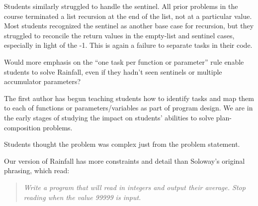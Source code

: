 Students similarly struggled to handle the sentinel.  All prior
problems in the course terminated a list recursion at the end of the
list, not at a particular value.  Most students recognized 
the sentinel as another base case for recursion, but they
struggled to reconcile the return values in the empty-list and
sentinel cases, especially in light of the -1. This is again a failure
to separate tasks in their code.

\begin{openq}
Would more emphasis on the ``one task per function or
parameter'' rule enable students to solve Rainfall,
even if they hadn't seen sentinels or multiple accumulator parameters?
\end{openq}

The first author has begun teaching students how to identify tasks and
map them to each of functions or parameters/variables as part of
program design. We are in the early stages of studying the impact on
students' abilities to solve plan-composition problems.





\begin{obs}
Students thought the problem was complex just from the problem
statement.
\end{obs}

Our version of Rainfall has more constraints and detail than Soloway's
original phrasing, which read:

\begin{quote}\it
  Write a program that will read in integers and output their
  average. Stop reading when the value 99999 is input.
\end{quote}


